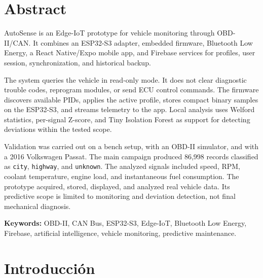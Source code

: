\documentclass[12pt,letterpaper]{report}
\begin{document}
\newpage

\chapter*{Abstract}

AutoSense is an Edge-IoT prototype for vehicle monitoring through OBD-II/CAN. It combines an ESP32-S3 adapter, embedded firmware, Bluetooth Low Energy, a React Native/Expo mobile app, and Firebase services for profiles, user session, synchronization, and historical backup.

The system queries the vehicle in read-only mode. It does not clear diagnostic trouble codes, reprogram modules, or send ECU control commands. The firmware discovers available PIDs, applies the active profile, stores compact binary samples on the ESP32-S3, and streams telemetry to the app. Local analysis uses Welford statistics, per-signal Z-score, and Tiny Isolation Forest as support for detecting deviations within the tested scope.

Validation was carried out on a bench setup, with an OBD-II simulator, and with a 2016 Volkswagen Passat. The main campaign produced 86,998 records classified as \texttt{city}, \texttt{highway}, and \texttt{unknown}. The analyzed signals included speed, RPM, coolant temperature, engine load, and instantaneous fuel consumption. The prototype acquired, stored, displayed, and analyzed real vehicle data. Its predictive scope is limited to monitoring and deviation detection, not final mechanical diagnosis.

\textbf{Keywords:} OBD-II, CAN Bus, ESP32-S3, Edge-IoT, Bluetooth Low Energy, Firebase, artificial intelligence, vehicle monitoring, predictive maintenance.

\newpage

\tableofcontents
\newpage

\listoffigures
{}
\newpage

\listoftables
{}
\newpage


\chapter*{Introducción}
\end{document}
